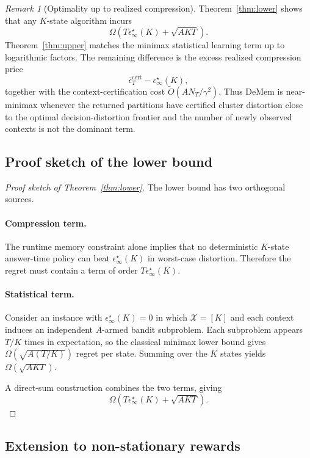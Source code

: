 \documentclass{article}
\theoremstyle{plain}
\theoremstyle{definition}
\theoremstyle{remark}
\newtheorem{remark}{Remark}
\newcommand{\cX}{\mathcal{X}}
\newcommand{\eps}{\epsilon}
\begin{document}
\begin{remark}[Optimality up to realized compression]
\label{rem:recover-floor}
Theorem~\ref{thm:lower} shows that any \(K\)-state algorithm incurs
\[
\Omega\!\left(T\eps^\star_\infty(K)+\sqrt{AKT}\right).
\]
Theorem~\ref{thm:upper} matches the minimax statistical learning term up to
logarithmic factors. The remaining difference is the excess realized
compression price
\[
\bar\eps^{\mathrm{cert}}_T-\eps^\star_\infty(K),
\]
together with the context-certification cost
\(\tilde O(A N_T/\gamma^2)\). Thus DeMem is near-minimax whenever
the returned partitions have certified cluster distortion close to the
optimal decision-distortion frontier and the number of newly observed
contexts is not the dominant term.
\end{remark}

\subsection{Proof sketch of the lower bound}
\label{app:lower-proof}

\begin{proof}[Proof sketch of Theorem~\ref{thm:lower}]
The lower bound has two orthogonal sources.

\paragraph{Compression term.}
The runtime memory constraint alone implies that no deterministic
\(K\)-state answer-time policy can beat
\(\eps^\star_\infty(K)\) in worst-case distortion. Therefore the regret
must contain a term of order \(T\eps^\star_\infty(K)\).

\paragraph{Statistical term.}
Consider an instance with \(\eps^\star_\infty(K)=0\) in which
\(\cX=[K]\) and each context induces an independent \(A\)-armed bandit
subproblem. Each subproblem appears \(T/K\) times in expectation, so the
classical minimax lower bound gives
\(\Omega(\sqrt{A(T/K)})\) regret per state. Summing over the \(K\) states
yields \(\Omega(\sqrt{AKT})\).

A direct-sum construction combines the two terms, giving
\[
\Omega\!\left(T\eps^\star_\infty(K)+\sqrt{AKT}\right).
\]
\end{proof}

\subsection{Extension to non-stationary rewards}
\label{app:nonstationary}
\end{document}
